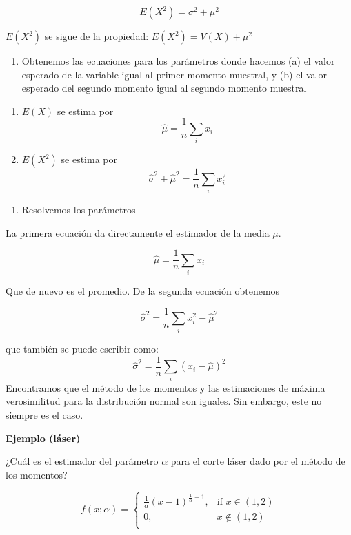 \documentclass[
]{book}
\providecommand{\tightlist}{%
  \setlength{\itemsep}{0pt}\setlength{\parskip}{0pt}}
\begin{document}
\[E(X^2)=\sigma^2+\mu^2\]

\(E(X^2)\) se sigue de la propiedad: \(E(X^2) = V(X)+\mu^2\)

\begin{enumerate}
\def\labelenumi{\arabic{enumi}.}
\setcounter{enumi}{1}
\tightlist
\item
  Obtenemos las ecuaciones para los parámetros donde hacemos (a) el valor esperado de la variable igual al primer momento muestral, y (b) el valor esperado del segundo momento igual al segundo momento muestral
\end{enumerate}

\begin{enumerate}
\def\labelenumi{\alph{enumi}.}
\tightlist
\item
  \(E(X)\) se estima por \[\hat{\mu}=\frac{1}{n}\sum_i x_i\]
\item
  \(E(X^2)\) se estima por \[\hat{\sigma}^2+\hat{\mu}^2=\frac{1}{n}\sum_i x^2_i\]
\end{enumerate}

\begin{enumerate}
\def\labelenumi{\arabic{enumi}.}
\setcounter{enumi}{2}
\tightlist
\item
  Resolvemos los parámetros
\end{enumerate}

La primera ecuación da directamente el estimador de la media \(\mu\).

\[\hat{\mu}=\frac{1}{n}\sum_i x_i\]

Que de nuevo es el promedio. De la segunda ecuación obtenemos

\[\hat{\sigma}^2= \frac{1}{n} \sum_i x^2_i-\hat{\mu}^2\]

que también se puede escribir como:
\[\hat{\sigma}^2=\frac{1}{n} \sum_i(x_i-\hat{\mu})^2\]
Encontramos que el método de los momentos y las estimaciones de máxima verosimilitud para la distribución normal son iguales. Sin embargo, este no siempre es el caso.

\textbf{Ejemplo (láser)}

¿Cuál es el estimador del parámetro \(\alpha\) para el corte láser dado por el método de los momentos?

\[
    f(x; \alpha)= 
\begin{cases}
\frac{1}{\alpha}(x-1)^{\frac{1}{\alpha}-1},& \text{if } x \in (1,2)\\
    0,& x \notin (1,2)\\
\end{cases}
\]
\end{document}
